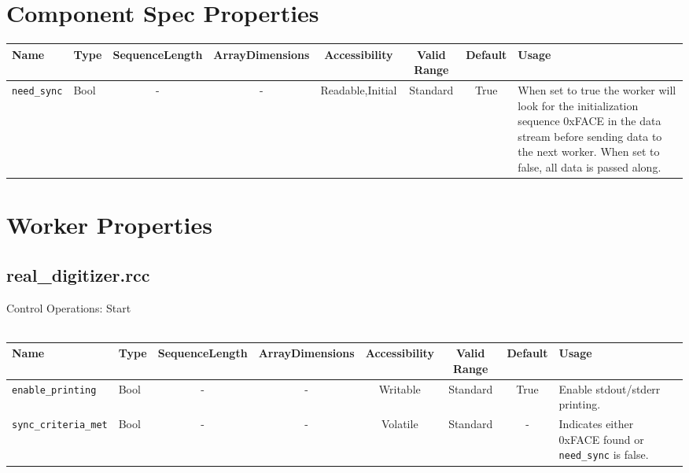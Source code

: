\documentclass{article}
\def\comp{real\_digitizer}
\begin{document}
\begin{landscape}
	\section*{Component Spec Properties}
	\begin{scriptsize}
		\begin{tabular}{|p{3cm}|p{1.5cm}|c|c|c|c|c|p{7cm}|}
			\hline
			\rowcolor{blue}
			Name             & Type & SequenceLength & ArrayDimensions & Accessibility    & Valid Range & Default & Usage                                                                                                                                                                                \\
			\hline
			\verb+need_sync+ & Bool & -              & -               & Readable,Initial & Standard    & True    & When set to true the worker will look for the initialization sequence 0xFACE in the data stream before sending data to the next worker. When set to false, all data is passed along. \\
			\hline
		\end{tabular}
	\end{scriptsize}

	\section*{Worker Properties}
	\subsection*{\comp.rcc}
	Control Operations: Start \\ \\
	\begin{scriptsize}
		\begin{tabular}{|p{3cm}|p{1.5cm}|c|c|c|c|c|p{7cm}|}
			\hline
			\rowcolor{blue}
			Name             & Type & SequenceLength & ArrayDimensions & Accessibility    & Valid Range & Default & Usage                                                                                                                                                                                \\
			\hline
			\verb+enable_printing+ & Bool & -              & -               & Writable & Standard    & True    & Enable stdout/stderr printing. \\
			\hline
			\verb+sync_criteria_met+ & Bool & -              & -               & Volatile & Standard    & -       & Indicates either 0xFACE found or \verb+need_sync+ is false. \\
			\hline
		\end{tabular}
	\end{scriptsize}


\end{landscape}
\end{document}

